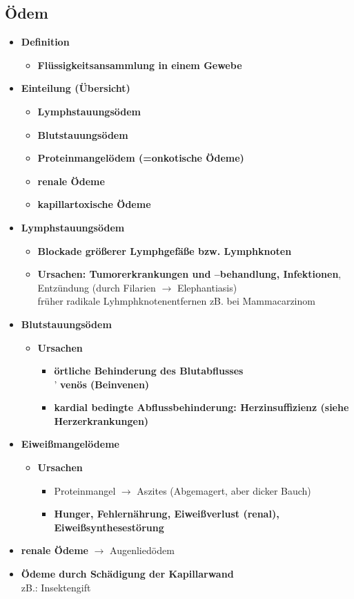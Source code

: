 	\subsection{Ödem}
		\begin{itemize}
			\item \textbf{Definition}
				\begin{itemize}
					\item \textbf{Flüssigkeitsansammlung in einem Gewebe}
				\end{itemize}
			\item \textbf{Einteilung (Übersicht)}
				\begin{itemize}
					\item \textbf{Lymphstauungsödem}
					\item \textbf{Blutstauungsödem}
					\item \textbf{Proteinmangelödem (=onkotische Ödeme)}
					\item \textbf{renale Ödeme}
					\item \textbf{kapillartoxische Ödeme}
				\end{itemize}
			\item \textbf{Lymphstauungsödem}
				\begin{itemize}
					\item \textbf{Blockade größerer Lymphgefäße bzw. Lymphknoten}
					\item \textbf{Ursachen: Tumorerkrankungen und –behandlung, Infektionen}, Entzündung (durch Filarien $\rightarrow$ Elephantiasis)\\
						früher radikale Lyhmphknotenentfernen zB. bei Mammacarzinom
				\end{itemize}
			\item \textbf{Blutstauungsödem}
				\begin{itemize}
					\item \textbf{Ursachen}
						\begin{itemize}
							\item \textbf{örtliche Behinderung des Blutabflusses}\\
								' \textbf{venös (Beinvenen)}
							\item \textbf{kardial bedingte Abflussbehinderung: Herzinsuffizienz (siehe Herzerkrankungen)}
						\end{itemize}
				\end{itemize}
			\item \textbf{Eiweißmangelödeme}
				\begin{itemize}
					\item \textbf{Ursachen}
						\begin{itemize}
							\item Proteinmangel $\rightarrow$ Aszites (Abgemagert, aber dicker Bauch)
							\item \textbf{Hunger, Fehlernährung, Eiweißverlust (renal), Eiweißsynthesestörung}
						\end{itemize}
				\end{itemize}
			\item \textbf{renale Ödeme} $\rightarrow$ Augenliedödem
			\item \textbf{Ödeme durch Schädigung der Kapillarwand}\\
				zB.: Insektengift
		\end{itemize}
